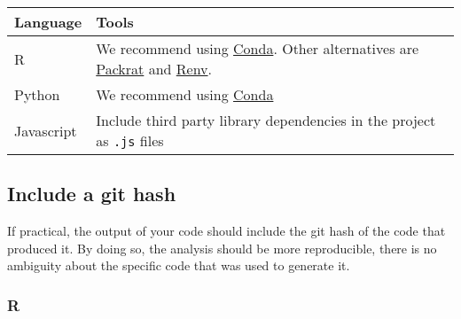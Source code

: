 \documentclass[]{book}
\begin{document}
\begin{longtable}[]{@{}ll@{}}
\toprule
\begin{minipage}[b]{0.20\columnwidth}\raggedright
Language\strut
\end{minipage} & \begin{minipage}[b]{0.74\columnwidth}\raggedright
Tools\strut
\end{minipage}\tabularnewline
\midrule
\endhead
\begin{minipage}[t]{0.20\columnwidth}\raggedright
R\strut
\end{minipage} & \begin{minipage}[t]{0.74\columnwidth}\raggedright
We recommend using \href{https://user-guidance.services.alpha.mojanalytics.xyz/appendix/conda/\#content}{Conda}. Other alternatives are \href{https://rstudio.github.io/packrat/}{Packrat} and \href{https://blog.rstudio.com/2019/11/06/renv-project-environments-for-r/}{Renv}.\strut
\end{minipage}\tabularnewline
\begin{minipage}[t]{0.20\columnwidth}\raggedright
Python\strut
\end{minipage} & \begin{minipage}[t]{0.74\columnwidth}\raggedright
We recommend using \href{https://user-guidance.services.alpha.mojanalytics.xyz/appendix/conda/\#content}{Conda}\strut
\end{minipage}\tabularnewline
\begin{minipage}[t]{0.20\columnwidth}\raggedright
Javascript\strut
\end{minipage} & \begin{minipage}[t]{0.74\columnwidth}\raggedright
Include third party library dependencies in the project as \texttt{.js} files\strut
\end{minipage}\tabularnewline
\bottomrule
\end{longtable}

\hypertarget{githash}{%
\subsection*{Include a git hash}\label{githash}}

If practical, the output of your code should include the git hash of the code that produced it. By doing so, the analysis should be
more reproducible, there is no ambiguity about the specific code that was used to generate it.

\hypertarget{r}{%
\subsubsection*{R}\label{r}}
\end{document}

